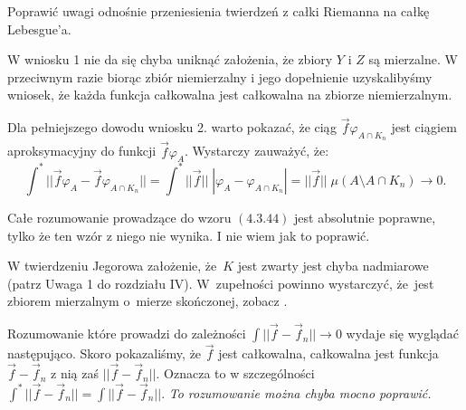 \documentclass[a4paper,11pt]{article}
\begin{document}
\vspace{\spaceFour}


\start {} Poprawić uwagi odnośnie przeniesienia twierdzeń z
całki Riemanna na całkę Lebesgue'a.

\vspace{\spaceFour}


\start {} W wniosku 1 nie da się chyba uniknąć założenia, że
zbiory $Y$ i $Z$ są mierzalne. W przeciwnym razie biorąc zbiór
niemierzalny i jego dopełnienie uzyskalibyśmy wniosek, że każda
funkcja całkowalna jest całkowalna na zbiorze niemierzalnym.

\vspace{\spaceFour}


\start {} Dla pełniejszego dowodu wniosku 2. warto pokazać, że
ciąg $\vec{ f } \varphi_{ A \cap K_{ n } }$ jest ciągiem
aproksymacyjny do funkcji $\vec{ f } \varphi_{ A }$. Wystarczy
zauważyć, że:
\begin{equation*}
  \int^{ * } || \vec{ f } \varphi_{ A } - \vec{ f }
  \varphi_{ A \cap K_{ n } } || = \int^{ * } || \vec{ f } || \;
  | \varphi_{ A } - \varphi_{ A \cap K_{ n } } | = || \vec{ f } || \;
  \mu( A \setminus A \cap K_{ n } ) \to 0.
\end{equation*}

\start {} Całe rozumowanie prowadzące do wzoru $(4.3.44)$ jest
absolutnie poprawne, tylko że ten wzór z niego nie wynika. I nie wiem
jak to poprawić.

\vspace{\spaceFour}


\start {} W twierdzeniu Jegorowa założenie, że~$K$ jest zwarty
jest chyba nadmiarowe (patrz Uwaga 1 do rozdziału IV). W~zupełności
powinno wystarczyć, że~jest zbiorem mierzalnym o~mierze skończonej,
zobacz \cite{Rud86}.

\vspace{\spaceFour}


\start {} Rozumowanie które prowadzi do zależności
$\int || \vec{ f } - \vec{ f }_{ n } || \to 0$ wydaje się wyglądać
następująco. Skoro pokazaliśmy, że $\vec{ f }$ jest całkowalna,
całkowalna jest funkcja $\vec{ f } - \vec{ f }_{ n }$ z nią zaś
$|| \vec{ f } - \vec{ f }_{ n } ||$. Oznacza to w szczególności
$\int^{ * } || \vec{ f } - \vec{ f }_{ n } || = \int || \vec{ f } -
\vec{ f }_{ n } ||$. \emph{To rozumowanie można chyba mocno poprawić.}

\vspace{\spaceFour}
\end{document}

